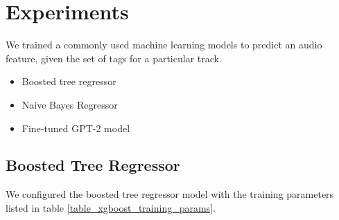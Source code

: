 \documentclass[sn-mathphys]{sn-jnl}%
\theoremstyle{thmstyleone}%
\theoremstyle{thmstyletwo}%
\theoremstyle{thmstylethree}%
\begin{document}
\section{Experiments}

We trained a commonly used machine learning models to predict an audio feature, given the set of tags for a particular track.

\begin{itemize}
      \item Boosted tree regressor \cite{xgboost}
      \item Naive Bayes Regressor \cite{bayesian}
      \item Fine-tuned GPT-2 model
\end{itemize}

\subsection{Boosted Tree Regressor}

We configured the boosted tree regressor model with the training parameters listed in table \ref{table_xgboost_training_params}.
\end{document}
